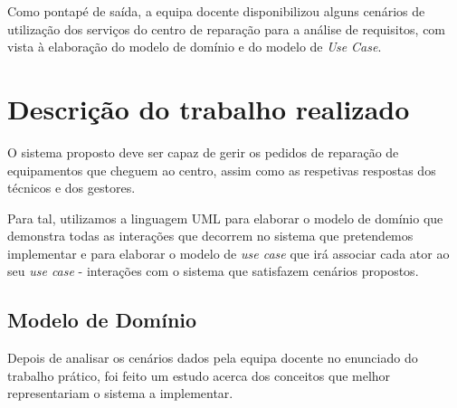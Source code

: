 \documentclass{article}
\begin{document}
Como pontapé de saída, a equipa docente disponibilizou alguns cenários de utilização dos serviços do centro de reparação para a análise de requisitos, com vista à elaboração do modelo de domínio e do modelo de \textit{Use Case}.


\section{Descrição do trabalho realizado}
O sistema proposto deve ser capaz de gerir os pedidos de reparação de equipamentos que cheguem ao centro, assim como as respetivas respostas dos técnicos e dos gestores. \par
Para tal, utilizamos a linguagem UML para elaborar o modelo de domínio que demonstra todas as
interações que decorrem no sistema que pretendemos implementar e para elaborar o modelo de \textit{use case} que irá associar cada ator ao seu \textit{use case} - interações com o sistema que satisfazem cenários propostos.

\subsection{Modelo de Domínio}
Depois de analisar os cenários dados pela equipa docente no enunciado do trabalho prático, foi
feito um estudo acerca dos conceitos que melhor representariam o sistema a implementar. \par
\end{document}
